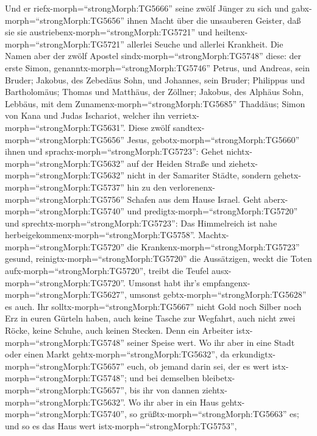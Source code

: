  Und er riefx-morph=``strongMorph:TG5666'' seine zwölf
Jünger zu sich und gabx-morph=``strongMorph:TG5656'' ihnen Macht über
die unsauberen Geister, daß sie sie
austriebenx-morph=``strongMorph:TG5721'' und
heiltenx-morph=``strongMorph:TG5721'' allerlei Seuche und allerlei
Krankheit.  Die Namen aber der zwölf Apostel
sindx-morph=``strongMorph:TG5748'' diese: der erste Simon,
genanntx-morph=``strongMorph:TG5746'' Petrus, und Andreas, sein Bruder;
Jakobus, des Zebedäus Sohn, und Johannes, sein Bruder; 
Philippus und Bartholomäus; Thomas und Matthäus, der Zöllner; Jakobus,
des Alphäus Sohn, Lebbäus, mit dem Zunamenx-morph=``strongMorph:TG5685''
Thaddäus;  Simon von Kana und Judas Ischariot, welcher ihn
verrietx-morph=``strongMorph:TG5631''.  Diese zwölf
sandtex-morph=``strongMorph:TG5656'' Jesus,
gebotx-morph=``strongMorph:TG5660'' ihnen und
sprachx-morph=``strongMorph:TG5723'': Gehet
nichtx-morph=``strongMorph:TG5632'' auf der Heiden Straße und
ziehetx-morph=``strongMorph:TG5632'' nicht in der Samariter Städte,
 sondern gehetx-morph=``strongMorph:TG5737'' hin zu den
verlorenenx-morph=``strongMorph:TG5756'' Schafen aus dem Hause Israel.
 Geht aberx-morph=``strongMorph:TG5740'' und
predigtx-morph=``strongMorph:TG5720'' und
sprechtx-morph=``strongMorph:TG5723'': Das Himmelreich ist nahe
herbeigekommenx-morph=``strongMorph:TG5758''. 
Machtx-morph=``strongMorph:TG5720'' die
Krankenx-morph=``strongMorph:TG5723'' gesund,
reinigtx-morph=``strongMorph:TG5720'' die Aussätzigen, weckt die Toten
aufx-morph=``strongMorph:TG5720'', treibt die Teufel
ausx-morph=``strongMorph:TG5720''. Umsonst habt ihr's
empfangenx-morph=``strongMorph:TG5627'', umsonst
gebtx-morph=``strongMorph:TG5628'' es auch.  Ihr
solltx-morph=``strongMorph:TG5667'' nicht Gold noch Silber noch Erz in
euren Gürteln haben,  auch keine Tasche zur Wegfahrt, auch
nicht zwei Röcke, keine Schuhe, auch keinen Stecken. Denn ein Arbeiter
istx-morph=``strongMorph:TG5748'' seiner Speise wert.  Wo
ihr aber in eine Stadt oder einen Markt
gehtx-morph=``strongMorph:TG5632'', da
erkundigtx-morph=``strongMorph:TG5657'' euch, ob jemand darin sei, der
es wert istx-morph=``strongMorph:TG5748''; und bei demselben
bleibetx-morph=``strongMorph:TG5657'', bis ihr von dannen
ziehtx-morph=``strongMorph:TG5632''.  Wo ihr aber in ein
Haus gehtx-morph=``strongMorph:TG5740'', so
grüßtx-morph=``strongMorph:TG5663'' es;  und so es das Haus
wert istx-morph=``strongMorph:TG5753'',
